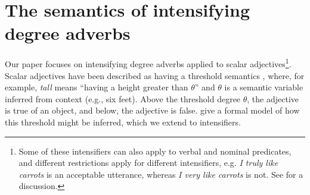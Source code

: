 \documentclass[10pt,letterpaper]{article}
\newcommand{\w}[1]{\emph{#1}}
\newcommand{\todo}[1]{{\color{red}#1}}
\begin{document}
%
%
%
%



\section{The semantics of intensifying degree adverbs}

Our paper focuses on intensifying degree adverbs applied to scalar adjectives\footnote{Some of these intensifiers can also apply to verbal and nominal predicates, and different restrictions apply for different intensifiers, e.g. \w{I truly like carrots} is an acceptable utterance, whereas \w{I very like carrots} is not. See  for a discussion.}. Scalar adjectives have been described as having a threshold semantics \cite{kennedy}, where, for example, \w{tall} means ``having a height greater than $\theta$'' and $\theta$ is a %
semantic variable inferred from context (e.g., six feet). Above the threshold degree $\theta$, the adjective is true of an object, and below, the adjective is false.
 give a formal model of how this threshold might be inferred, which we extend to intensifiers.
\end{document}
